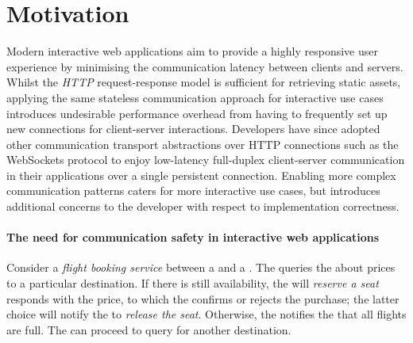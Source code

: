 %
%
%
%
%
%

\section{Motivation}
\label{section:intro}

Modern interactive web applications aim to 
provide a highly responsive user experience by 
minimising the communication latency between clients and servers. 
Whilst the \textit{HTTP} 
request-response model is 
sufficient for retrieving static assets, 
applying the same 
stateless communication approach for 
interactive use cases 
introduces 
undesirable performance overhead from having to 
frequently set up 
new connections for client-server interactions. 
Developers have since adopted other communication 
transport abstractions over HTTP connections such 
as the WebSockets protocol \cite{WebSocketRFC}
to enjoy low-latency full-duplex 
client-server communication in their applications over 
a single persistent connection. 
Enabling more complex communication patterns caters for 
more interactive use cases, but introduces additional 
concerns to the developer with respect to implementation correctness.

\paragraph{The need for communication safety 
in interactive web applications}

Consider a \textit{flight booking service}
between a  and a .
The  queries the 
about prices to a particular destination.
If there is still availability, 
the  will \textit{reserve a seat}
responds with the price,
to which the  confirms or rejects the purchase;
the latter choice will notify the 
to \textit{release the seat}.
Otherwise, the  notifies the
 that all flights are full.
The  can proceed to query for another
destination.

